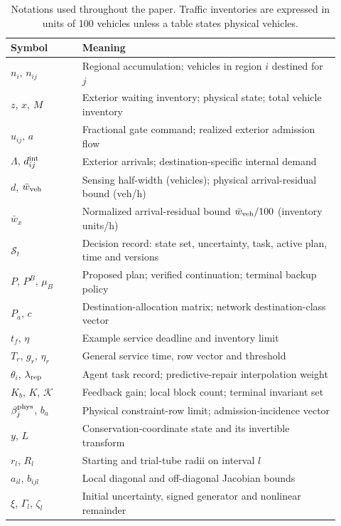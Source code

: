 \documentclass[preprint,12pt]{elsarticle}
\begin{document}
\begin{table}[!t]
\centering\small
\caption{Notations used throughout the paper. Traffic inventories are expressed in units of
100 vehicles unless a table states physical vehicles.}
\label{tab:nomenclature}
\renewcommand{\arraystretch}{0.98}
\begin{tabular}{@{}p{0.20\linewidth}p{0.72\linewidth}@{}}
\toprule
Symbol & Meaning\\
\midrule
$n_i$, $n_{ij}$ & Regional accumulation; vehicles in region $i$ destined for $j$\\
$z$, $x$, $M$ & Exterior waiting inventory; physical state; total vehicle inventory\\
$u_{ij}$, $a$ & Fractional gate command; realized exterior admission flow\\
$\Lambda$, $d^{\rm int}_{ij}$ & Exterior arrivals; destination-specific internal demand\\
$d$, $\bar w_{\rm veh}$ & Sensing half-width (vehicles); physical arrival-residual bound (veh/h)\\
$\bar w_x$ & Normalized arrival-residual bound $\bar w_{\rm veh}/100$ (inventory units/h)\\
$\mathcal S_t$ & Decision record: state set, uncertainty, task, active plan, time and versions\\
$P$, $P^B$, $\mu_B$ & Proposed plan; verified continuation; terminal backup policy\\
$P_a$, $c$ & Destination-allocation matrix; network destination-class vector\\
$t_f$, $\eta$ & Example service deadline and inventory limit\\
$T_r$, $g_r$, $\eta_r$ & General service time, row vector and threshold\\
$\theta_i$, $\lambda_{\rm rep}$ & Agent task record; predictive-repair interpolation weight\\
$K_b$, $K$, $\mathcal K$ & Feedback gain; local block count; terminal invariant set\\
$\beta_j^{\rm phys}$, $b_a$ & Physical constraint-row limit; admission-incidence vector\\
$y$, $L$ & Conservation-coordinate state and its invertible transform\\
$r_l$, $R_l$ & Starting and trial-tube radii on interval $l$\\
$a_{il}$, $b_{ijl}$ & Local diagonal and off-diagonal Jacobian bounds\\
$\xi$, $\Gamma_l$, $\zeta_l$ & Initial uncertainty, signed generator and nonlinear remainder\\

\end{tabular}
\end{table}
\end{document}
